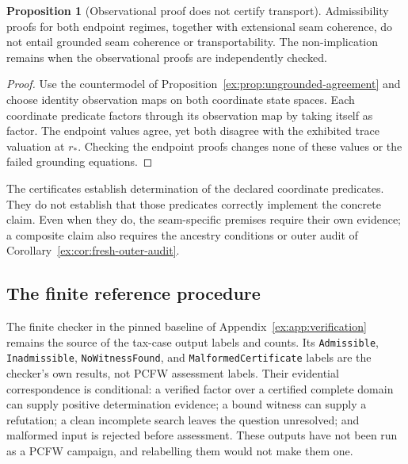 \documentclass[11pt]{article}
\theoremstyle{definition}
\newtheorem{proposition}{Proposition}[section]
\newcommand{\code}[1]{\texttt{#1}}
\begin{document}
\begin{proposition}[Observational proof does not certify transport]\label{ex:prop:observation-not-transport}
Admissibility proofs for both endpoint regimes, together with extensional seam coherence, do not entail grounded seam coherence or transportability. The non-implication remains when the observational proofs are independently checked.
\end{proposition}
\begin{proof}
Use the countermodel of Proposition~\ref{ex:prop:ungrounded-agreement} and choose identity observation maps on both coordinate state spaces. Each coordinate predicate factors through its observation map by taking itself as factor. The endpoint values agree, yet both disagree with the exhibited trace valuation at $r_*$. Checking the endpoint proofs changes none of these values or the failed grounding equations.
\end{proof}

The certificates establish determination of the declared coordinate predicates. They do not establish that those predicates correctly implement the concrete claim. Even when they do, the seam-specific premises require their own evidence; a composite claim also requires the ancestry conditions or outer audit of Corollary~\ref{ex:cor:fresh-outer-audit}.

\subsection{The finite reference procedure}\label{ex:sec:finite-procedure}

The finite checker in the pinned baseline of Appendix~\ref{ex:app:verification} remains the source of the tax-case output labels and counts. Its \code{Admissible}, \code{Inadmissible}, \code{NoWitnessFound}, and \code{MalformedCertificate} labels are the checker's own results, not PCFW assessment labels. Their evidential correspondence is conditional: a verified factor over a certified complete domain can supply positive determination evidence; a bound witness can supply a refutation; a clean incomplete search leaves the question unresolved; and malformed input is rejected before assessment. These outputs have not been run as a PCFW campaign, and relabelling them would not make them one.
\end{document}
